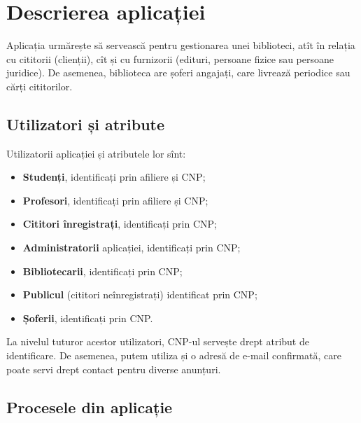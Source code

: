 
\chapter{Descrierea aplicației}

Aplicația urmărește să servească pentru gestionarea unei biblioteci,
atît în relația cu cititorii (clienții), cît și cu furnizorii (edituri,
persoane fizice sau persoane juridice). De asemenea, biblioteca are
șoferi angajați, care livrează periodice sau cărți cititorilor.

\section{Utilizatori și atribute}
\label{sec:util-atr}

Utilizatorii aplicației și atributele lor sînt:
\begin{itemize}
\item \textbf{Studenți}, identificați prin afiliere și CNP;
\item \textbf{Profesori}, identificați prin afiliere și CNP;
\item \textbf{Cititori înregistrați}, identificați prin CNP;
\item \textbf{Administratorii} aplicației, identificați prin CNP;
\item \textbf{Bibliotecarii}, identificați prin CNP;
\item \textbf{Publicul} (cititori neînregistrați) identificat prin CNP;
\item \textbf{Șoferii}, identificați prin CNP.
\end{itemize}

La nivelul tuturor acestor utilizatori, CNP-ul servește drept atribut
de identificare. De asemenea, putem utiliza și o adresă de e-mail confirmată,
care poate servi drept contact pentru diverse anunțuri.

\section{Procesele din aplicație}
\label{sec:procese}


